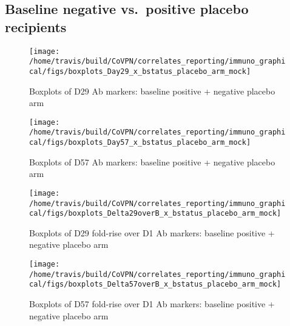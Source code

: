 \documentclass[]{book}
\theoremstyle{definition}
\theoremstyle{definition}
\theoremstyle{definition}
\newcommand{\1}{\mathbbm{1}}
\begin{document}
\hypertarget{baseline-negative-vs.positive-placebo-recipients}{%
\subsection{Baseline negative vs.~positive placebo recipients}\label{baseline-negative-vs.positive-placebo-recipients}}

\begin{figure}[H]

{\centering \texttt{[image: /home/travis/build/CoVPN/correlates\_reporting/immuno\_graphical/figs/boxplots\_Day29\_x\_bstatus\_placebo\_arm\_mock]} 

}

\caption{Boxplots of D29 Ab markers: baseline positive + negative placebo arm}\label{fig:unnamed-chunk-49}
\end{figure}

\begin{figure}[H]

{\centering \texttt{[image: /home/travis/build/CoVPN/correlates\_reporting/immuno\_graphical/figs/boxplots\_Day57\_x\_bstatus\_placebo\_arm\_mock]} 

}

\caption{Boxplots of D57 Ab markers: baseline positive + negative placebo arm}\label{fig:unnamed-chunk-50}
\end{figure}

\begin{figure}[H]

{\centering \texttt{[image: /home/travis/build/CoVPN/correlates\_reporting/immuno\_graphical/figs/boxplots\_Delta29overB\_x\_bstatus\_placebo\_arm\_mock]} 

}

\caption{Boxplots of D29 fold-rise over D1 Ab markers: baseline positive + negative placebo arm}\label{fig:unnamed-chunk-51}
\end{figure}

\begin{figure}[H]

{\centering \texttt{[image: /home/travis/build/CoVPN/correlates\_reporting/immuno\_graphical/figs/boxplots\_Delta57overB\_x\_bstatus\_placebo\_arm\_mock]} 

}

\caption{Boxplots of D57 fold-rise over D1 Ab markers: baseline positive + negative placebo arm}\label{fig:unnamed-chunk-52}
\end{figure}
\end{document}
